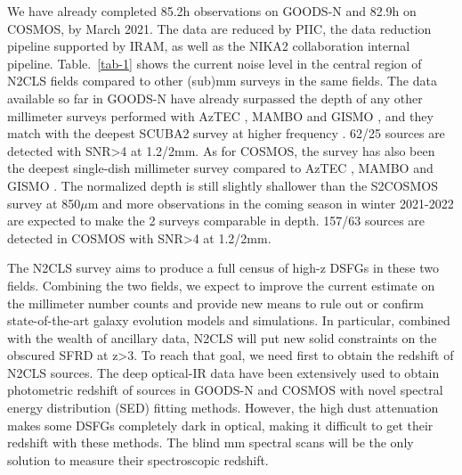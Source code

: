 \documentclass{webofc}
\newcommand{\GL}[1]{\textcolor{red}{[{\bf GL}: #1]}}
\begin{document}
We have already completed 85.2h observations on GOODS-N and 82.9h on COSMOS, by March 2021. The data are reduced by PIIC, the data reduction pipeline supported by IRAM\cite{Zylka13}, as well as the NIKA2 collaboration internal pipeline. Table.~\ref{tab-1} shows the current noise level in the central region of N2CLS fields compared to other (sub)mm surveys in the same fields. The data available so far in GOODS-N have already surpassed the depth of any other millimeter surveys performed with AzTEC \cite{azgn}, MAMBO \cite{mambogn} and GISMO \cite{gismogn}, and they match with the deepest SCUBA2 survey at higher frequency \cite{scuba2gn}. 62/25 sources are detected with SNR>4 at 1.2/2mm. As for COSMOS, the survey has also been the deepest single-dish millimeter survey compared to AzTEC  \cite{azcos}, MAMBO \cite{mambo} and GISMO \cite{gismocos}. The normalized depth is still slightly shallower than the S2COSMOS survey \cite{s2cosmos} at 850$\mu$m and more observations in the coming season in winter 2021-2022 are expected to make the 2 surveys comparable in depth. 157/63 sources are detected in COSMOS with SNR>4 at 1.2/2mm.

The N2CLS survey aims to produce a full census of high-z DSFGs in
these two fields. Combining the two fields, we expect to improve the current estimate on the millimeter number counts and provide new means to rule out or confirm state-of-the-art galaxy evolution models and simulations. In particular, combined with the wealth of ancillary data, N2CLS will put new solid constraints on the obscured SFRD at z>3. To reach that goal, we need first to obtain the redshift of N2CLS sources. The deep optical-IR data have been extensively used to obtain photometric redshift of sources in GOODS-N and COSMOS with novel spectral energy distribution (SED) fitting methods. However, the high dust attenuation makes some DSFGs completely dark in optical, making it difficult to get their redshift with these methods. The blind mm spectral scans will be the only solution to measure their spectroscopic redshift.%
\end{document}
